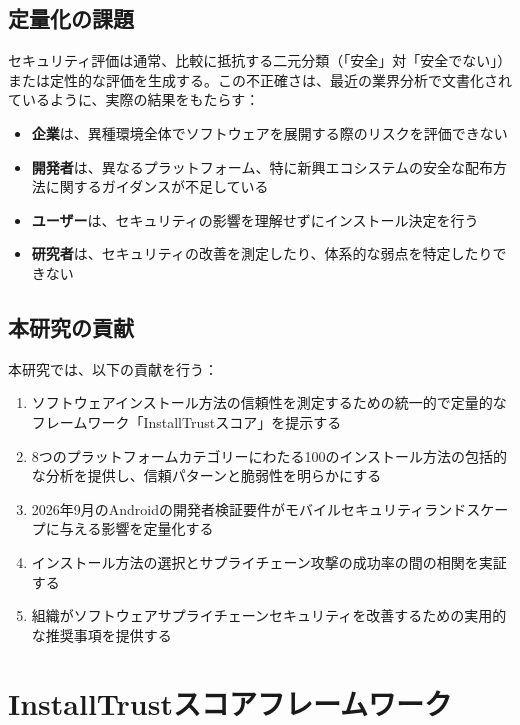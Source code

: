 \documentclass[Specialissue]{jsaiart}
\begin{document}
\subsection{定量化の課題}

セキュリティ評価は通常、比較に抵抗する二元分類（「安全」対「安全でない」）または定性的な評価を生成する。この不正確さは、最近の業界分析で文書化されているように、実際の結果をもたらす\cite{forrester2024appsec,gartner2024supply}：

\begin{itemize}
    \item \textbf{企業}は、異種環境全体でソフトウェアを展開する際のリスクを評価できない
    \item \textbf{開発者}は、異なるプラットフォーム、特に新興エコシステムの安全な配布方法に関するガイダンスが不足している\cite{rustup2024security,golang2024modules}
    \item \textbf{ユーザー}は、セキュリティの影響を理解せずにインストール決定を行う
    \item \textbf{研究者}は、セキュリティの改善を測定したり、体系的な弱点を特定したりできない\cite{zahan2024packages}
\end{itemize}

\subsection{本研究の貢献}

本研究では、以下の貢献を行う：

\begin{enumerate}
    \item ソフトウェアインストール方法の信頼性を測定するための統一的で定量的なフレームワーク「InstallTrustスコア」を提示する
    \item 8つのプラットフォームカテゴリーにわたる100のインストール方法の包括的な分析を提供し、信頼パターンと脆弱性を明らかにする
    \item 2026年9月のAndroidの開発者検証要件がモバイルセキュリティランドスケープに与える影響を定量化する
    \item インストール方法の選択とサプライチェーン攻撃の成功率の間の相関を実証する
    \item 組織がソフトウェアサプライチェーンセキュリティを改善するための実用的な推奨事項を提供する
\end{enumerate}

\section{InstallTrustスコアフレームワーク}
\end{document}
